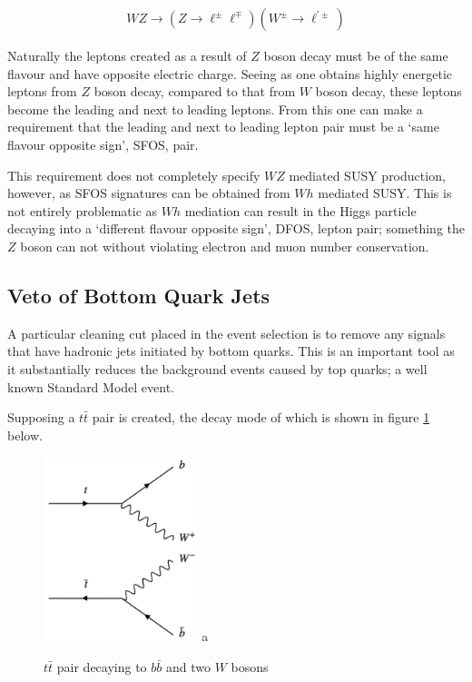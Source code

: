 \begin{align}
WZ \rightarrow \left(Z \rightarrow \ell^{\pm} \ell^{\mp} \right) \left(W^{\pm} \rightarrow \ell^{\prime \pm}\right)
\end{align}

\noindent Naturally the leptons created as a result of $Z$ boson decay must be of the same flavour and have opposite electric charge.
Seeing as one obtains highly energetic leptons from $Z$ boson decay, compared to that from $W$ boson decay, these leptons become the leading and next to leading leptons. 
From this one can make a requirement that the leading and next to leading lepton pair must be a `same flavour opposite sign', SFOS, pair.

This requirement does not completely specify $WZ$ mediated SUSY production, however, as SFOS signatures can be obtained from $Wh$ mediated SUSY.
This is not entirely problematic as $Wh$ mediation can result in the Higgs particle decaying into a `different flavour opposite sign', DFOS, lepton pair; something the $Z$ boson can not without violating electron and muon number conservation.

\subsection{Veto of Bottom Quark Jets}
A particular cleaning cut placed in the event selection is to remove any signals that have hadronic jets initiated by bottom quarks.
This is an important tool as it substantially reduces the background events caused by top quarks; a well known Standard Model event.

Supposing a $t \bar{t}$ pair is created, the decay mode of which is shown in figure \ref{fig:ttbar} below.

\begin{figure}[H] %
   \centering
   \includegraphics[width=0.4\textwidth]{Pictures/ttbar.png} a
   \caption{$t \bar{t}$ pair decaying to $b \bar{b}$ and two $W$ bosons}
   \label{fig:ttbar}
\end{figure}

